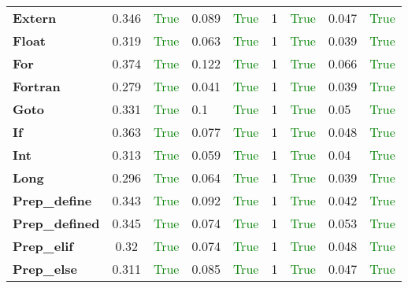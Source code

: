 \documentclass{article}
\begin{document}
\begin{xltabular}{\textwidth}{lcc}
\textbf{Extern}& 0.346&\textcolor{green}{True}& 0.089&\textcolor{green}{True}& 1&\textcolor{green}{True}& 0.047&\textcolor{green}{True} \\[0.5ex]
\textbf{Float}& 0.319&\textcolor{green}{True}& 0.063&\textcolor{green}{True}& 1&\textcolor{green}{True}& 0.039&\textcolor{green}{True} \\[0.5ex]
\textbf{For}& 0.374&\textcolor{green}{True}& 0.122&\textcolor{green}{True}& 1&\textcolor{green}{True}& 0.066&\textcolor{green}{True} \\[0.5ex]
\textbf{Fortran}& 0.279&\textcolor{green}{True}& 0.041&\textcolor{green}{True}& 1&\textcolor{green}{True}& 0.039&\textcolor{green}{True} \\[0.5ex]
\textbf{Goto}& 0.331&\textcolor{green}{True}& 0.1&\textcolor{green}{True}& 1&\textcolor{green}{True}& 0.05&\textcolor{green}{True} \\[0.5ex]
\textbf{If}& 0.363&\textcolor{green}{True}& 0.077&\textcolor{green}{True}& 1&\textcolor{green}{True}& 0.048&\textcolor{green}{True} \\[0.5ex]
\textbf{Int}& 0.313&\textcolor{green}{True}& 0.059&\textcolor{green}{True}& 1&\textcolor{green}{True}& 0.04&\textcolor{green}{True} \\[0.5ex]
\textbf{Long}& 0.296&\textcolor{green}{True}& 0.064&\textcolor{green}{True}& 1&\textcolor{green}{True}& 0.039&\textcolor{green}{True} \\[0.5ex]
\textbf{Prep\_define}& 0.343&\textcolor{green}{True}& 0.092&\textcolor{green}{True}& 1&\textcolor{green}{True}& 0.042&\textcolor{green}{True} \\[0.5ex]
\textbf{Prep\_defined}& 0.345&\textcolor{green}{True}& 0.074&\textcolor{green}{True}& 1&\textcolor{green}{True}& 0.053&\textcolor{green}{True} \\[0.5ex]
\textbf{Prep\_elif}& 0.32&\textcolor{green}{True}& 0.074&\textcolor{green}{True}& 1&\textcolor{green}{True}& 0.048&\textcolor{green}{True} \\[0.5ex]
\textbf{Prep\_else}& 0.311&\textcolor{green}{True}& 0.085&\textcolor{green}{True}& 1&\textcolor{green}{True}& 0.047&\textcolor{green}{True} \\[0.5ex]
\bottomrule
\end{xltabular}
\newpage
\end{document}
